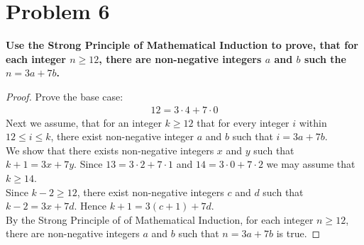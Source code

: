 \documentclass[english,11pt,a4paper]{article}
\begin{document}
\section*{Problem 6}
\textbf{Use the Strong Principle of Mathematical Induction to prove, that for each integer $n\geq 12$, there are non-negative integers $a$ and $b$ such the $n=3a+7b$.}
\begin{proof}

Prove the base case:
\begin{align}
12=3\cdot 4+7\cdot 0
\end{align}
Next we assume, that for an integer $k \geq 12 $ that for every integer $i$ within $12 \leq i \leq k$, there exist non-negative integer $a$ and $b$ such that $i=3a+7b$.
\\
We show that there exists non-negative integers $x$ and $y$ such that $k+1=3x+7y$.
Since $13=3\cdot 2+7\cdot 1$ and $14=3\cdot 0+7\cdot 2$ we may assume that $k\geq 14$.
\\
Since $k-2\geq 12$, there exist non-negative integers $c$ and $d$ such that $k-2 = 3x+7d$.
Hence $k+1=3(c+1)+7d$.
\\
By the Strong Principle of of Mathematical Induction, for each integer $n \geq 12$, there are non-negative integers $a$ and $b$ such that $n = 3a + 7b$ is true.
\end{proof}
\end{document}
